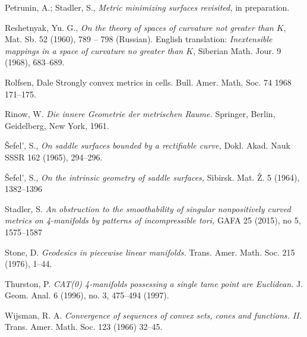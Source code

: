 \begin{thebibliography}{52}

Petrunin, A.; 
Stadler, S., 
\textit{Metric minimizing surfaces revisited,}
in preparation.

Reshetnyak, Yu. G.,
\textit{On the theory of spaces of curvature not greater than $K$},
 Mat. Sb. 52 (1960), 789 -- 798 (Russian).
English translation: \textit{Inextensible mappings in a space of curvature
no greater than $K$}, Siberian Math. Jour. 9 (1968), 683--689.

 Rolfsen, Dale
Strongly convex metrics in cells.
Bull. Amer. Math. Soc. 74 1968 171–175.

Rinow, W. 
\textit{Die innere Geometrie der metrischen Raume.} Springer, Berlin, Geidelberg, New York, 1961.

\v{S}efel', S.,
\textit{On saddle surfaces bounded by a rectifiable curve,} 
Dokl. Akad. Nauk SSSR 
162 
(1965), 
294--296.

\v{S}efel', S., 
\textit{On the intrinsic geometry of saddle surfaces,} Sibirsk. Mat. \v{Z}. 
5 
(1964), 
1382--1396

Stadler, S.
\textit{An obstruction to the smoothability of singular nonpositively curved metrics on 4-manifolds by patterns of incompressible tori,}
GAFA
25 (2015), 
no 5, 
1575--1587

Stone, D.
\textit{Geodesics in piecewise linear manifolds.}
Trans. Amer. Math. Soc. 
215 
(1976), 
1--44.

 Thurston, P.
\textit{CAT(0) 4-manifolds possessing a single tame point are Euclidean.} 
J. Geom. Anal. 
6 (1996), 
no. 3, 
475--494 (1997). 

 Wijsman, R. A. 
\textit{Convergence of sequences of convex sets, cones and functions. II.} 
Trans. Amer. Math. Soc. 
123 (1966) 32--45.


\end{thebibliography}
